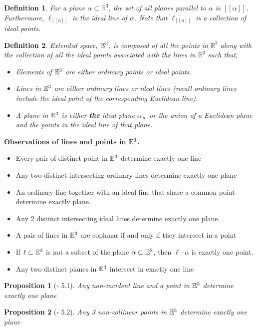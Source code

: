 \documentclass[12pt]{amsart}
\newtheorem*{proposition}{Proposition}
\newtheorem*{definition}{Definition}
\theoremstyle{remark}
\newtheorem*{basic notion}{Basic Notion}
\newcommand{\RR}{\ensuremath{\mathbb R}}
\newcommand{\EE}{{\ensuremath\mathbb E}}
\begin{document}
\begin{definition} 
For a plane $\alpha \subset \RR^3$, the set of all planes parallel to $\alpha$ is $[\! [\alpha]\!]$. Furthermore,  $\ell_{[\![\alpha]\!]}$ is the ideal line of $\alpha$. Note that $\ell_{[\![\alpha]\!]}$ is a collection of ideal points.
\end{definition}
\smallskip

\begin{definition}
Extended space, $\EE^3$, is composed of all the points in $\RR^3$ along with the collection of all the ideal points associated with the lines in $\RR^3$ such that,
\begin{itemize}
\item Elements of $\EE^3$ are either ordinary points or ideal points.
\item Lines in $\EE^3$ are either ordinary lines or ideal lines (recall ordinary lines include the ideal point of the corresponding Euclidean line). 
\item A plane in $\EE^3$ is either \textbf{the} ideal plane $\alpha_{\infty}$ or the union of a Euclidean plane and the points in the ideal line of that plane.
\end{itemize}
\end{definition}
 
\noindent\textbf{Observations of lines and points in $\EE^3$.}

\begin{itemize}
\item Every pair of distinct point in $\EE^3$ determine exactly one line 
\item Any two distinct intersecting ordinary lines determine exactly one plane
\item An ordinary line together with an ideal line that share a common point determine exactly plane.
\item Any 2 distinct intersecting ideal lines determine exactly one plane. 
\item A pair of lines in $\EE^3$ are coplanar if and only if they intersect in a point
\item If $\ell \subset \EE^3$ is not a subset of the plane $\alpha \subset \EE^3$, then $\ell \cdot \alpha$ is exactly one point.
\item Any two distinct planes in $\EE^3$ intersect in exactly one line 
\end{itemize}
\begin{proposition}[$\square$ 5.1] Any non-incident line and a point in $\EE^3$ determine exactly one plane
\end{proposition}
\smallskip
\begin{proposition}[$\square$ 5.2] Any 3 non-collinear points in $\EE^3$ determine exactly one plane
\end{proposition}
\smallskip
\end{document}
